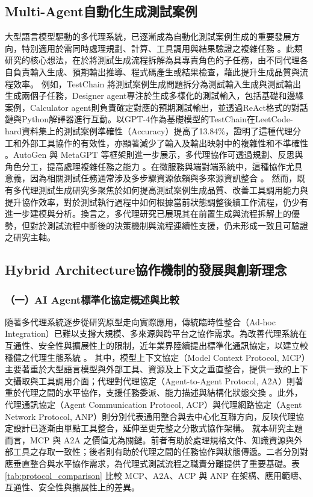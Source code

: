 \begin{ZhChapter}
\subsection{Multi-Agent自動化生成測試案例}
\text 大型語言模型驅動的多代理系統，已逐漸成為自動化測試案例生成的重要發展方向，特別適用於需同時處理規劃、計算、工具調用與結果驗證之複雜任務 \parencite{Anonymous2023LLMGenerators, Bandi2025Rise, Hosseini2025Role, Borghoff2025Beyond}。此類研究的核心想法，在於將測試生成流程拆解為具專責角色的子任務，由不同代理各自負責輸入生成、預期輸出推導、程式碼產生或結果檢查，藉此提升生成品質與流程效率。
\text 例如，TestChain 將測試案例生成問題拆分為測試輸入生成與測試輸出生成兩個子任務，Designer agent專注於生成多樣化的測試輸入，包括基礎和邊緣案例，Calculator agent則負責確定對應的預期測試輸出，並透過ReAct格式的對話鏈與Python解譯器進行互動。以GPT-4作為基礎模型的TestChain在LeetCode-hard資料集上的測試案例準確性（Accuracy）提高了13.84\%，證明了這種代理分工和外部工具協作的有效性，亦顯著減少了輸入及輸出映射中的複雜性和不準確性 \parencite{Anonymous2023LLMGenerators}。AutoGen 與 MetaGPT 等框架則進一步展示，多代理協作可透過規劃、反思與角色分工，提高處理複雜任務之能力 \parencite{Bandi2025Rise}。在微服務與端對端系統中，這種協作尤具意義，因為相關測試任務通常涉及多步驟資源依賴與多來源資訊整合 \parencite{Sun2024Detecting}。
\text 然而，既有多代理測試生成研究多聚焦於如何提高測試案例生成品質、改善工具調用能力與提升協作效率，對於測試執行過程中如何根據當前狀態調整後續工作流程，仍少有進一步建模與分析。換言之，多代理研究已展現其在前置生成與流程拆解上的優勢，但對於測試流程中斷後的決策機制與流程連續性支援，仍未形成一致且可驗證之研究主軸。

\subsection{Hybrid Architecture協作機制的發展與創新理念}
\subsubsection*{（一）AI Agent標準化協定概述與比較}
\text 隨著多代理系統逐步從研究原型走向實際應用，傳統臨時性整合（Ad-hoc Integration）已難以支撐大規模、多來源與跨平台之協作需求。為改善代理系統在互通性、安全性與擴展性上的限制，近年業界陸續提出標準化通訊協定，以建立較穩健之代理生態系統 \parencite{Ehtesham2025SurveyMCPACPA2AANP}。
\text 其中，模型上下文協定（Model Context Protocol, MCP）主要著重於大型語言模型與外部工具、資源及上下文之垂直整合，提供一致的上下文攝取與工具調用介面；代理對代理協定（Agent-to-Agent Protocol, A2A）則著重於代理之間的水平協作，支援任務委派、能力描述與結構化狀態交換 \parencite{Ehtesham2025SurveyMCPACPA2AANP}。此外，代理通訊協定（Agent Communication Protocol, ACP）與代理網路協定（Agent Network Protocol, ANP）則分別代表通用整合與去中心化互聯方向，反映代理協定設計已逐漸由單點工具整合，延伸至更完整之分散式協作架構。
\text 就本研究主題而言，MCP 與 A2A 之價值尤為關鍵。前者有助於處理規格文件、知識資源與外部工具之存取一致性；後者則有助於代理之間的任務協作與狀態傳遞。二者分別對應垂直整合與水平協作需求，為代理式測試流程之職責分離提供了重要基礎。表 \ref{tab:protocol_comparison} 比較 MCP、A2A、ACP 與 ANP 在架構、應用範疇、互通性、安全性與擴展性上的差異。


\end{ZhChapter}
